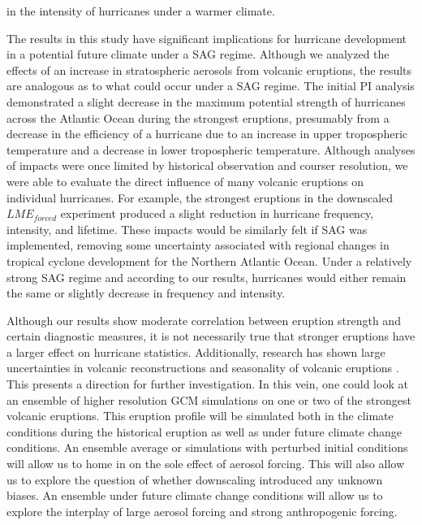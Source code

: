 \documentclass[phd,tocprelim]{cornell}
\begin{document}
in the intensity of hurricanes under a warmer climate. 
\par
The results in this study have significant implications for hurricane 
development in a potential future climate under a SAG regime.  Although we 
analyzed the effects of an increase in stratospheric aerosols from volcanic 
eruptions, the results are analogous as to what could occur under a SAG regime. 
The initial PI analysis demonstrated a slight decrease in the maximum potential 
strength of hurricanes across the Atlantic Ocean during the strongest eruptions, 
presumably from a decrease in the efficiency of a hurricane due to an increase 
in upper tropospheric temperature and a decrease in lower tropospheric 
temperature. Although analyses of impacts were once limited by historical 
observation and courser resolution, we were able to evaluate the direct 
influence of many volcanic eruptions on individual hurricanes.  For example, 
the strongest eruptions in the downscaled $LME_{forced}$ experiment produced 
a slight reduction in hurricane frequency, intensity, and lifetime. These 
impacts would be similarly felt if SAG was implemented, removing some 
uncertainty associated with regional changes in tropical cyclone development 
for the Northern Atlantic Ocean. Under a relatively strong SAG regime and 
according to our results, hurricanes would either remain the same or slightly 
decrease in frequency and intensity.
\par
Although our results show moderate correlation between eruption strength and 
certain diagnostic measures, it is not necessarily true that stronger 
eruptions have a larger effect on hurricane statistics. Additionally, research 
has shown large uncertainties in volcanic reconstructions and 
seasonality of volcanic eruptions 
\cite{schmidt2012climate,schmidt2011climate,stevenson2017role,raible2016tambora}.
This presents a direction for further investigation. 
In this vein, one could look at an ensemble of higher resolution GCM simulations 
on one or two of the strongest volcanic eruptions. This eruption profile 
will be simulated both in the climate conditions during the historical eruption 
as well as under future climate change conditions. An ensemble average or 
simulations with perturbed initial conditions will allow us to home in on the 
sole effect of aerosol forcing. This will also allow us to explore the 
question of whether downscaling introduced any unknown biases. An ensemble 
under future climate change conditions will allow us to explore the interplay 
of large aerosol forcing and strong anthropogenic forcing.    
\par
\end{document}
